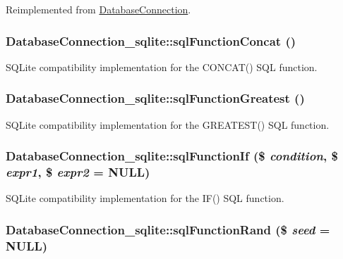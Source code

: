 Reimplemented from \hyperlink{classDatabaseConnection_aef0f8cd6cbfbc304e721baaa14be14cf}{DatabaseConnection}.\hypertarget{classDatabaseConnection__sqlite_a2010b85b6de63730c73214f75f6e5662}{
\subsubsection[{sqlFunctionConcat}]{\setlength{\rightskip}{0pt plus 5cm}DatabaseConnection\_\-sqlite::sqlFunctionConcat ()}}
\label{classDatabaseConnection__sqlite_a2010b85b6de63730c73214f75f6e5662}
SQLite compatibility implementation for the CONCAT() SQL function. \hypertarget{classDatabaseConnection__sqlite_aed7d02bd21b71e91aae093937fbac0d1}{
\subsubsection[{sqlFunctionGreatest}]{\setlength{\rightskip}{0pt plus 5cm}DatabaseConnection\_\-sqlite::sqlFunctionGreatest ()}}
\label{classDatabaseConnection__sqlite_aed7d02bd21b71e91aae093937fbac0d1}
SQLite compatibility implementation for the GREATEST() SQL function. \hypertarget{classDatabaseConnection__sqlite_af784370971ff72b29f853466c42d1561}{
\subsubsection[{sqlFunctionIf}]{\setlength{\rightskip}{0pt plus 5cm}DatabaseConnection\_\-sqlite::sqlFunctionIf (\$ {\em condition}, \/  \$ {\em expr1}, \/  \$ {\em expr2} = {\ttfamily NULL})}}
\label{classDatabaseConnection__sqlite_af784370971ff72b29f853466c42d1561}
SQLite compatibility implementation for the IF() SQL function. \hypertarget{classDatabaseConnection__sqlite_aae54e984c066601c97c47328743cda1d}{
\subsubsection[{sqlFunctionRand}]{\setlength{\rightskip}{0pt plus 5cm}DatabaseConnection\_\-sqlite::sqlFunctionRand (\$ {\em seed} = {\ttfamily NULL})}}
